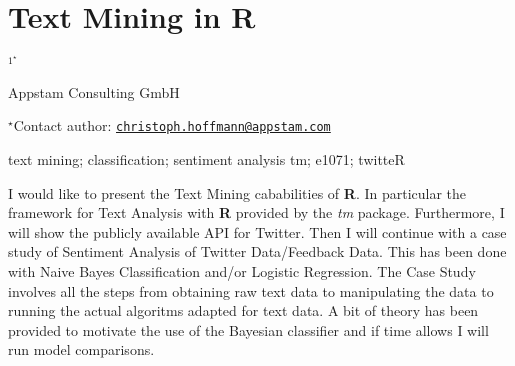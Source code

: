 \documentclass[\main/boa.tex]{subfiles}
\begin{document}
\section{Text Mining in R}

\begin{center}
  {\bf {}$^{1^\star}$}
\end{center}

\vskip 0.3cm

\begin{affiliations}
\begin{enumerate}
\begin{minipage}{0.915\textwidth}
\centering
\item Appstam Consulting GmbH \\[-2pt]
\end{minipage}
\end{enumerate}
$^\star$Contact author: \href{mailto:christoph.hoffmann@appstam.com}{\nolinkurl{christoph.hoffmann@appstam.com}}\\
\end{affiliations}

\vskip 0.5cm

\begin{minipage}{0.915\textwidth}
\keywords text mining; classification; sentiment analysis
\packages tm; e1071; twitteR
\end{minipage}

\vskip 0.8cm

I would like to present the Text Mining cababilities of \textbf{R}. In
particular the framework for Text Analysis with \textbf{R} provided by
the \emph{tm} package. Furthermore, I will show the publicly available
API for Twitter. Then I will continue with a case study of Sentiment
Analysis of Twitter Data/Feedback Data. This has been done with Naive
Bayes Classification and/or Logistic Regression. The Case Study involves
all the steps from obtaining raw text data to manipulating the data to
running the actual algoritms adapted for text data. A bit of theory has
been provided to motivate the use of the Bayesian classifier and if time
allows I will run model comparisons.
\end{document}
